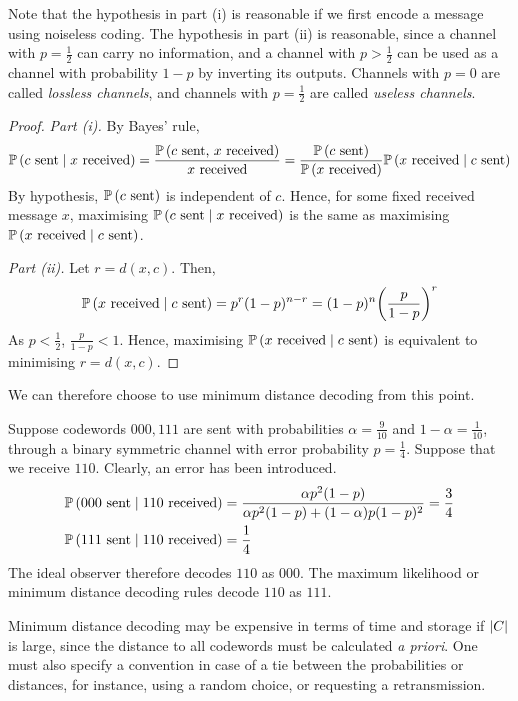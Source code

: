 Note that the hypothesis in part (i) is reasonable if we first encode a message using noiseless coding.
The hypothesis in part (ii) is reasonable, since a channel with \( p = \frac{1}{2} \) can carry no information, and a channel with \( p > \frac{1}{2} \) can be used as a channel with probability \( 1 - p \) by inverting its outputs.
Channels with \( p = 0 \) are called \emph{lossless channels}, and channels with \( p = \frac{1}{2} \) are called \emph{useless channels}.
\begin{proof}
    \emph{Part (i).}
    By Bayes' rule,
    \[ \mathbb{P}\left({c \text{ sent} \mid x \text{ received}}\right) = \frac{\mathbb{P}\left({c \text{ sent, } x \text{ received}}\right)}{x \text{ received}} = \frac{\mathbb{P}\left({c \text{ sent}}\right)}{\mathbb{P}\left({x \text{ received}}\right)} \mathbb{P}\left({x \text{ received} \mid c \text{ sent}}\right) \]
    By hypothesis, \( \mathbb{P}\left({c \text{ sent}}\right) \) is independent of \( c \).
    Hence, for some fixed received message \( x \), maximising \( \mathbb{P}\left({c \text{ sent} \mid x \text{ received}}\right) \) is the same as maximising \( \mathbb{P}\left({x \text{ received} \mid c \text{ sent}}\right) \).

    \emph{Part (ii).}
    Let \( r = d(x,c) \).
    Then,
    \[ \mathbb{P}\left({x \text{ received} \mid c \text{ sent}}\right) = p^r (1-p)^{n-r} = (1-p)^n \qty(\frac{p}{1-p})^r \]
    As \( p < \frac{1}{2} \), \( \frac{p}{1-p} < 1 \).
    Hence, maximising \( \mathbb{P}\left({x \text{ received} \mid c \text{ sent}}\right) \) is equivalent to minimising \( r = d(x,c) \).
\end{proof}
We can therefore choose to use minimum distance decoding from this point.
\begin{example}
    Suppose codewords \( 000, 111 \) are sent with probabilities \( \alpha = \frac{9}{10} \) and \( 1 - \alpha = \frac{1}{10} \), through a binary symmetric channel with error probability \( p = \frac{1}{4} \).
    Suppose that we receive \( 110 \).
    Clearly, an error has been introduced.
    \begin{align*}
        \mathbb{P}\left({000 \text{ sent} \mid 110 \text{ received}}\right) &= \frac{\alpha p^2 (1-p)}{\alpha p^2 (1-p) + (1-\alpha)p(1-p)^2} = \frac{3}{4} \\
        \mathbb{P}\left({111 \text{ sent} \mid 110 \text{ received}}\right) &= \frac{1}{4}
    \end{align*}
    The ideal observer therefore decodes \( 110 \) as \( 000 \).
    The maximum likelihood or minimum distance decoding rules decode \( 110 \) as \( 111 \).
\end{example}
\begin{remark}
    Minimum distance decoding may be expensive in terms of time and storage if \( \abs{C} \) is large, since the distance to all codewords must be calculated \emph{a priori}.
    One must also specify a convention in case of a tie between the probabilities or distances, for instance, using a random choice, or requesting a retransmission.
\end{remark}

